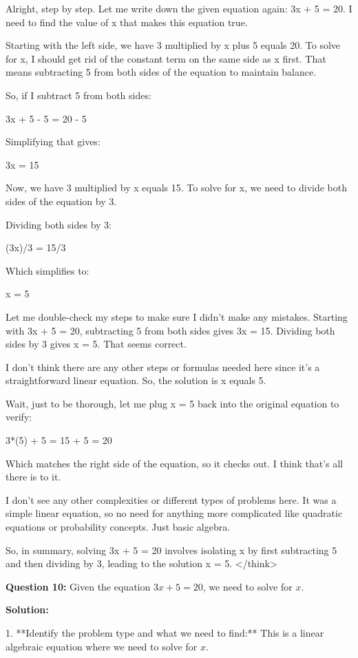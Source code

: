 \documentclass[12pt]{article}
\begin{document}
Alright, step by step. Let me write down the given equation again: 3x + 5 = 20. I need to find the value of x that makes this equation true.

Starting with the left side, we have 3 multiplied by x plus 5 equals 20. To solve for x, I should get rid of the constant term on the same side as x first. That means subtracting 5 from both sides of the equation to maintain balance.

So, if I subtract 5 from both sides: 

3x + 5 - 5 = 20 - 5

Simplifying that gives:

3x = 15

Now, we have 3 multiplied by x equals 15. To solve for x, we need to divide both sides of the equation by 3.

Dividing both sides by 3:

(3x)/3 = 15/3

Which simplifies to:

x = 5

Let me double-check my steps to make sure I didn't make any mistakes. Starting with 3x + 5 = 20, subtracting 5 from both sides gives 3x = 15. Dividing both sides by 3 gives x = 5. That seems correct.

I don't think there are any other steps or formulas needed here since it's a straightforward linear equation. So, the solution is x equals 5.

Wait, just to be thorough, let me plug x = 5 back into the original equation to verify:

3*(5) + 5 = 15 + 5 = 20

Which matches the right side of the equation, so it checks out. I think that's all there is to it.

I don't see any other complexities or different types of problems here. It was a simple linear equation, so no need for anything more complicated like quadratic equations or probability concepts. Just basic algebra.

So, in summary, solving 3x + 5 = 20 involves isolating x by first subtracting 5 and then dividing by 3, leading to the solution x = 5.
</think>

\textbf{Question 10:}  
Given the equation \(3x + 5 = 20\), we need to solve for \(x\).

\textbf{Solution:}

1. **Identify the problem type and what we need to find:** This is a linear algebraic equation where we need to solve for \(x\).
\end{document}
